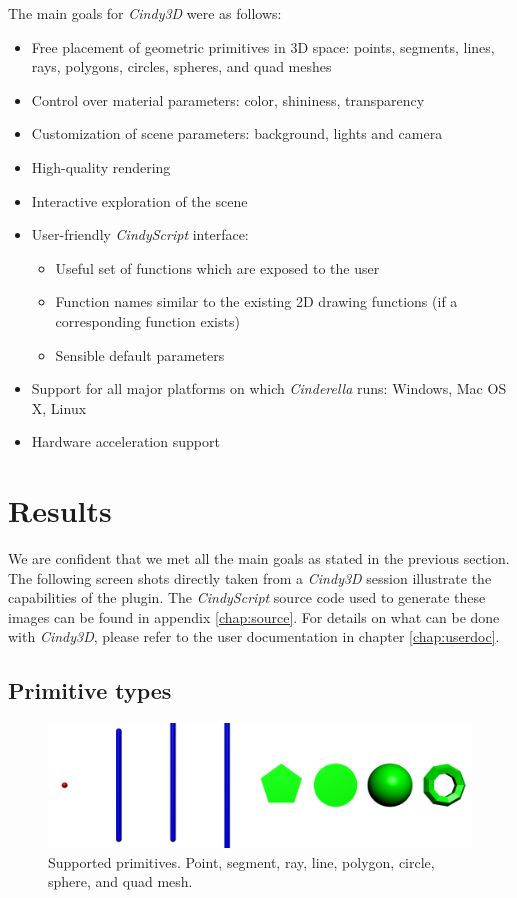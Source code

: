 \documentclass[appendixprefix,a4paper]{scrreprt}
\begin{document}
The main goals for \emph{Cindy3D} were as follows:
\begin{itemize}
\item Free placement of geometric primitives in 3D space: points, segments, 
lines, rays, polygons, circles, spheres, and quad meshes
\item Control over material parameters: color, shininess, transparency
\item Customization of scene parameters: background, lights and camera
\item High-quality rendering
\item Interactive exploration of the scene
\item User-friendly \emph{CindyScript} interface:
	\begin{itemize}
	\item Useful set of functions which are exposed to the user
	\item Function names similar to the existing 2D drawing functions (if a 
corresponding function exists)
	\item Sensible default parameters
	\end{itemize}
\item Support for all major platforms on which \emph{Cinderella} runs: 
Windows, Mac OS X, Linux
\item Hardware acceleration support
\end{itemize}

\section{Results}
We are confident that we met all the main goals as stated in the previous 
section. The following screen shots directly taken from a \emph{Cindy3D} 
session illustrate the capabilities of the plugin. The \emph{CindyScript} 
source code used to generate these images can be found in appendix 
\ref{chap:source}. For details on what can be done with \emph{Cindy3D}, please 
refer to the user documentation in chapter \ref{chap:userdoc}.

\subsection{Primitive types}

\begin{figure}
\centering
\includegraphics[width=\textwidth]{primitives}
\caption[Supported primitives]{Supported primitives. Point, segment, ray, 
line, polygon, circle, sphere, and quad mesh.}
\label{fig:primitives}
\end{figure}
\end{document}
